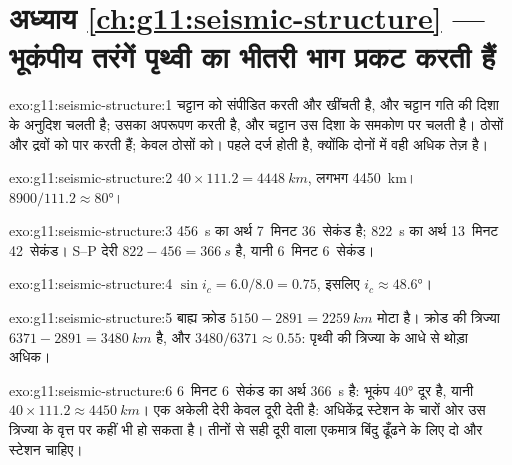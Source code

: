 \section*{अध्याय \ref{ch:g11:seismic-structure} --- भूकंपीय तरंगें पृथ्वी का भीतरी भाग प्रकट करती हैं}

\begin{solution}{exo:g11:seismic-structure:1}
 चट्टान को संपीडित करती और खींचती है, और चट्टान गति की दिशा के अनुदिश
चलती है;  उसका अपरूपण करती है, और चट्टान उस दिशा के समकोण पर
चलती है।  ठोसों और द्रवों को पार करती हैं;  केवल ठोसों को।  पहले दर्ज होती है, क्योंकि दोनों में वही अधिक तेज़ है।
\end{solution}

\begin{solution}{exo:g11:seismic-structure:2}
$40 \times 111.2 = \qty{4448}{km}$, लगभग \qty{4450}{km}। $8900/111.2
\approx \ang{80}$।
\end{solution}

\begin{solution}{exo:g11:seismic-structure:3}
\qty{456}{s} का अर्थ 7~मिनट 36~सेकंड है; \qty{822}{s} का अर्थ 13~मिनट
42~सेकंड। S--P देरी $822 - 456 = \qty{366}{s}$ है, यानी 6~मिनट
6~सेकंड।
\end{solution}

\begin{solution}{exo:g11:seismic-structure:4}
$\sin i_c = 6.0/8.0 = 0.75$, इसलिए $i_c \approx \ang{48.6}$।
\end{solution}

\begin{solution}{exo:g11:seismic-structure:5}
बाह्य क्रोड $5150 - 2891 = \qty{2259}{km}$ मोटा है। क्रोड की त्रिज्या
$6371 - 2891 = \qty{3480}{km}$ है, और $3480/6371 \approx 0.55$: पृथ्वी की त्रिज्या के
आधे से थोड़ा अधिक।
\end{solution}

\begin{solution}{exo:g11:seismic-structure:6}
6~मिनट 6~सेकंड का अर्थ \qty{366}{s} है: भूकंप \ang{40} दूर है, यानी
$40 \times 111.2 \approx \qty{4450}{km}$। एक अकेली देरी केवल
दूरी देती है: अधिकेंद्र स्टेशन के चारों ओर उस त्रिज्या के वृत्त पर कहीं भी हो
सकता है। तीनों से सही दूरी वाला एकमात्र बिंदु ढूँढने के लिए
दो और स्टेशन चाहिए।
\end{solution}

